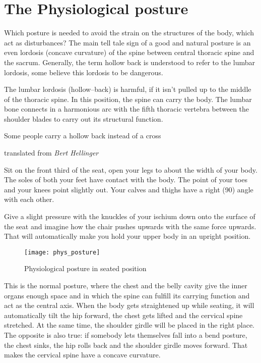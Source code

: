 \documentclass[../main.tex]{subfiles}
\begin{document}
\section{The Physiological posture}

Which posture is needed to avoid the strain on the structures of the body, which act as disturbances?
The main tell tale sign of a good and natural posture is an {even lordosis} (concave curvature) of the spine between central thoracic spine and the sacrum.
Generally, the term hollow back is understood to refer to the lumbar lordosis, some believe this lordosis to be dangerous.

The lumbar lordosis (hollow--back) is harmful, if it isn't {pulled up to the middle of the thoracic spine}.
In this position, the spine can carry the body.
The lumbar bone connects in a harmonious arc with the fifth thoracic vertebra between the shoulder blades to carry out its structural function.

\epigraph{Some people carry a hollow back instead of a cross}{translated from \textit{Bert Hellinger}}

Sit on the {front third of the seat}, {open your legs} to about the width of your body. \label{Posture:Sitting}
The soles of both your feet have {contact with the body}.
The point of your toes and your knees point slightly out. 
Your {calves and thighs} have a {right (90\degree) angle} with each other. 

Give a slight {pressure} with the knuckles of your ischium {down} onto the surface of the seat and imagine how the {chair pushes upwards} with the same force upwards.
That will automatically make you hold your upper body in an upright position.

        \begin{figure}[htb!]
          \centering
          \texttt{[image: phys\_posture]}
           \caption{Physiological posture in seated position~\cite{Haltung}}
        \end{figure}

        This is the {normal posture}, where the chest and the belly cavity give the inner {organs enough space}
        and in which the {spine} can fulfill its carrying function and act as the {central axis}. 
When the body gets straightened up while seating, it will automatically {tilt the hip forward}, the {chest gets lifted} and the {cervical spine stretched}.
At the same time, the shoulder girdle will be placed in the right place.
The opposite is also true: if somebody lets themselves fall into a {bend posture}, the {chest sinks}, the {hip rolls back} and the {shoulder girdle moves forward}. That makes the {cervical spine} have a {concave curvature}.
\end{document}
